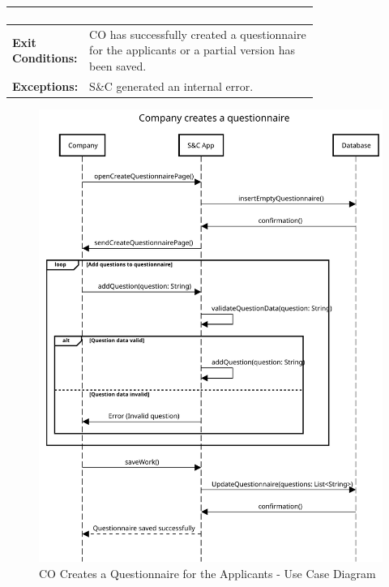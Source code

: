 \begin{center}
\begin{longtable}{|l|p{0.75\linewidth}|}
\begin{enumerate}
                                     \end{enumerate}                                \\
        \hline
        \textbf{Exit Conditions:}  & CO has successfully created a questionnaire for the applicants or a partial version has been saved.       \\
        \hline
        \textbf{Exceptions:}       & S\&C generated an internal error.                                                                         \\
        \hline
    \end{longtable}
\end{center}

\begin{figure}[H]
    \centering
    \includegraphics[width=1.0\textwidth]{Images/UC_11.pdf}
    \caption{CO Creates a Questionnaire for the Applicants - Use Case Diagram}
    \label{fig:use-case-diagram-11}
\end{figure}

